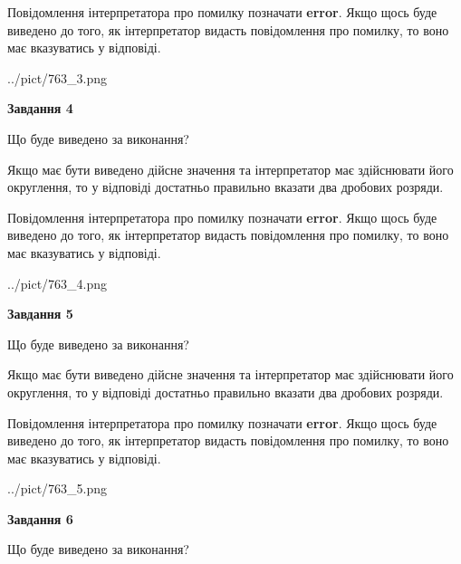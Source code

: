 \documentclass[12pt, ukrainian]{article}
\begin{document}
{\begin {Large}
Повідомлення інтерпретатора про помилку позначати \textbf{error}.
Якщо щось буде виведено до того, як інтерпретатор видасть повідомлення про помилку, 
то воно має вказуватись у відповіді. \par

\begin{center}
	{../pict/763_3.png}
\end{center}
\newpage

{\begin {center}\textbf{Завдання 4}\end {center}}\par
Що буде виведено за виконання? \par

Якщо має бути виведено дійсне значення та інтерпретатор має здійснювати його округлення, 
то у відповіді достатньо правильно вказати два дробових розряди.

Повідомлення інтерпретатора про помилку позначати \textbf{error}.
Якщо щось буде виведено до того, як інтерпретатор видасть повідомлення про помилку, 
то воно має вказуватись у відповіді. \par

\begin{center}
	{../pict/763_4.png}
\end{center}
\newpage

{\begin {center}\textbf{Завдання 5}\end {center}}\par
Що буде виведено за виконання? \par

Якщо має бути виведено дійсне значення та інтерпретатор має здійснювати його округлення, 
то у відповіді достатньо правильно вказати два дробових розряди.

Повідомлення інтерпретатора про помилку позначати \textbf{error}.
Якщо щось буде виведено до того, як інтерпретатор видасть повідомлення про помилку, 
то воно має вказуватись у відповіді. \par

\begin{center}
	{../pict/763_5.png}
\end{center}
\newpage

{\begin {center}\textbf{Завдання 6}\end {center}}\par
Що буде виведено за виконання? \par


\end{Large}}
\end{document}
